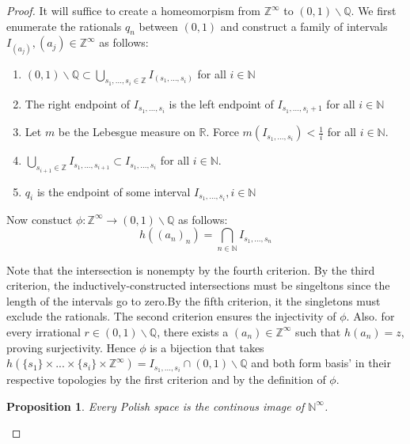 \documentclass[12pt]{article}
\newtheorem{proposition}{Proposition}[section]
\theoremstyle{remark}
\begin{document}
\begin{proof}
 It will suffice to create a homeomorpism from $\mathbb{Z}^{\infty}$ to $(0,1) \backslash \mathbb{Q}$. We first enumerate the rationals $q_n$ between $(0,1)$ and construct a family of intervals $I_{(a_j)}, (a_j) \in \mathbb{Z}^{\infty}$ as follows:
 \begin{enumerate}
  \item $(0,1) \backslash \mathbb{Q} \subset \bigcup_{s_1,...,s_i \in \mathbb{Z}} I_{(s_1,...,s_i)}$ for all $i \in \mathbb{N}$
  \item The right endpoint of $I_{s_1,...,s_i}$ is the left endpoint of $I_{s_1,...,s_i+1}$ for all $i \in \mathbb{N}$
  \item Let $m$ be the Lebesgue measure on $\mathbb{R}$. Force $m(I_{s_1,...,s_i}) < \frac{1}{i}$ for all $i \in \mathbb{N}$.
  \item $ \bigcup_{s_{i+1} \in \mathbb{Z}} I_{s_1,...,s_{i+1}} \subset I_{s_1,...,s_i}$ for all $i \in \mathbb{N}$.
  \item $q_i$ is the endpoint of some interval $I_{s_1,...,s_i}, i \in \mathbb{N}$
 \end{enumerate}
 
  Now constuct $\phi: \mathbb{Z}^{\infty} \rightarrow (0,1) \backslash \mathbb{Q}$
  as follows:
  $$h((a_n)_n) = \bigcap_{n \in \mathbb{N}} I_{s_1,...,s_n} $$

Note that the intersection is nonempty by the fourth criterion. By the third criterion, the inductively-constructed intersections must be singeltons since the length of the intervals go to zero.By the fifth criterion, it the singletons must exclude the rationals. The second criterion ensures the injectivity of $\phi$. Also. for every irrational $r \in (0,1) \backslash \mathbb{Q}$, there exists a $(a_n) \in \mathbb{Z}^{\infty}$ such that $h(a_n) = z$, proving surjectivity. Hence $\phi$ is a bijection that takes $h(\{s_1\} \times ... \times \{s_i\} \times \mathbb{Z}^{\infty}) = I_{s_1,...,s_i} \cap (0,1) \backslash \mathbb{Q}$ and both form basis' in their respective topologies by the first criterion and by the definition of $\phi$.

\begin{proposition}
Every Polish space is the continous image of $\mathbb{N}^{\infty}$.
\end{proposition}

  
\end{proof}
\end{document}
